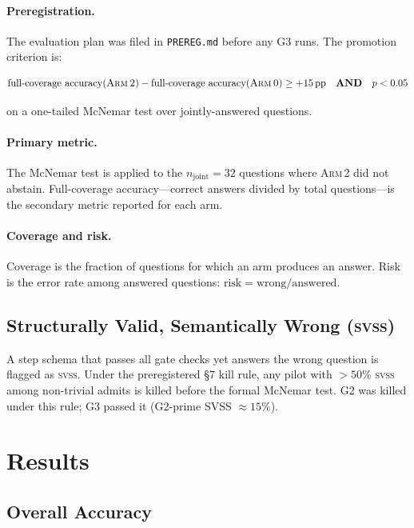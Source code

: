 \documentclass[11pt]{article}
\newcommand{\armi}{\textsc{Arm\,0}}
\newcommand{\armii}{\textsc{Arm\,2}}
\newcommand{\svss}{\textsc{svss}}
\newcommand{\mcnem}{McNemar}
\begin{document}
\paragraph{Preregistration.}  The evaluation plan was filed in
\texttt{PREREG.md} before any G3 runs.  The promotion criterion is:

\[
\text{full-coverage accuracy}(\text{\armii{}}) -
\text{full-coverage accuracy}(\text{\armi{}}) \geq +15\,\text{pp}
\quad\textbf{AND}\quad p < 0.05
\]

on a one-tailed \mcnem{} test over jointly-answered questions.

\paragraph{Primary metric.}  The \mcnem{} test \citep{mcnemar1947} is applied
to the $n_\text{joint}=32$ questions where \armii{} did not abstain.
Full-coverage accuracy---correct answers divided by total questions---is the
secondary metric reported for each arm.

\paragraph{Coverage and risk.}  Coverage is the fraction of questions for
which an arm produces an answer.  Risk is the error rate among answered
questions: $\text{risk} = \text{wrong} / \text{answered}$.

\subsection{Structurally Valid, Semantically Wrong (\svss{})}

A step schema that passes all gate checks yet answers the wrong question is
flagged as \svss{}.  Under the preregistered §7 kill rule, any pilot with
$>50\%$ \svss{} among non-trivial admits is killed before the formal \mcnem{}
test.  G2 was killed under this rule; G3 passed it (G2-prime SVSS $\approx 15\%$).

\section{Results}
\label{sec:results}

\subsection{Overall Accuracy}
\end{document}
